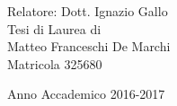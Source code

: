 \begin{titlepage}
\begin{center}
    \vfill
    \vspace{3cm}
    \begin{large}
    Relatore: Dott. Ignazio Gallo\\

    \vspace{1.0cm}
    Tesi di Laurea di\\
   Matteo Franceschi De Marchi\\
    Matricola 325680\\
    \vspace{0.5cm}

    \end{large}

    Anno Accademico 2016-2017

  \end{center}
\end{titlepage}
